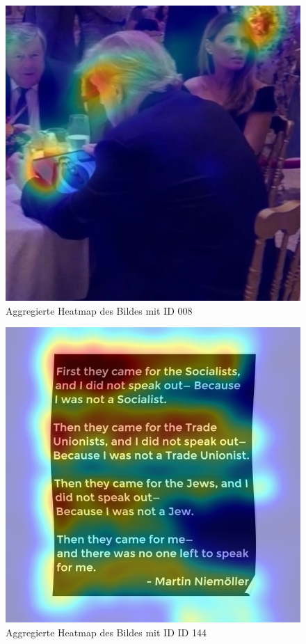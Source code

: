 \documentclass[
    language=german, %
    thesis=seminar, %
    supervisor=postdoc, %
    multiauthor=true, %
    ]{settings/csssa-thesis}
\begin{document}
\begin{figure}[h]
	\centering
	\includegraphics[width=\linewidth,height=0.8\textheight,keepaspectratio]{figures/id008_overlay.jpg}
	\caption{Aggregierte Heatmap des Bildes mit ID 008 }\label{fig:bildid008}
\end{figure}

\begin{figure}[h]
	\centering
	\includegraphics[width=\linewidth,height=0.8\textheight,keepaspectratio]{figures/id144_overlay.jpg}
	\caption{Aggregierte Heatmap des Bildes mit ID  ID 144}\label{fig:bildid144}
\end{figure}
\end{document}
